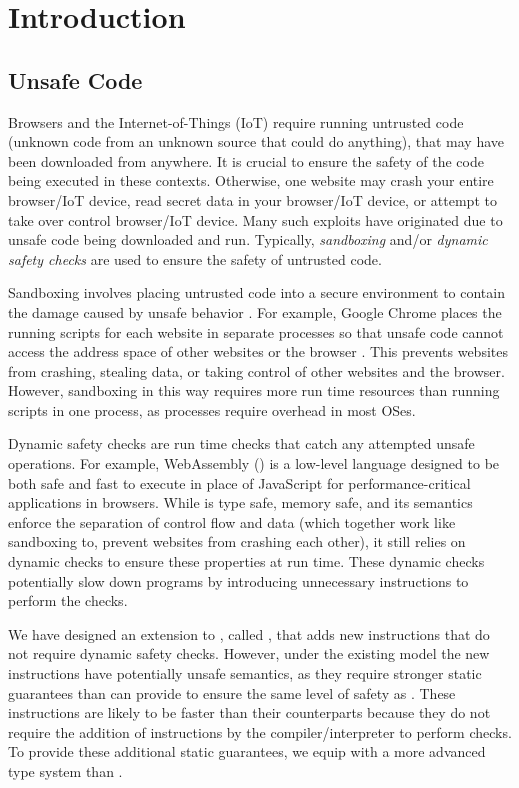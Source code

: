 \chapter{Introduction}
\label{chp:intro}

\section{Unsafe Code}
Browsers and the Internet-of-Things (IoT) require running untrusted code (\ie unknown code from an unknown source that could do anything), that may have been downloaded from anywhere.
It is crucial to ensure the safety of the code being executed in these contexts.
Otherwise, one website may crash your entire browser/IoT device, read secret data in your browser/IoT device, or attempt to take over control browser/IoT device.
Many such exploits have originated due to unsafe code being downloaded and run.
Typically, \emph{sandboxing} and/or \emph{dynamic safety checks} are used to ensure the safety of untrusted code.

Sandboxing involves placing untrusted code into a secure environment to contain the damage caused by unsafe behavior \cite{sandboxes}.
For example, Google Chrome places the running scripts for each website in separate processes so that unsafe code cannot access the address space of other websites or the browser \cite{chromesandbox}.
This prevents websites from crashing, stealing data, or taking control of other websites and the browser.
However, sandboxing in this way requires more run time resources than running scripts in one process, as processes require overhead in most OSes.

Dynamic safety checks are run time checks that catch any attempted unsafe operations.
For example, WebAssembly (\wasm) is a low-level language designed to be both safe and fast to execute in place of JavaScript for performance-critical applications in browsers.
While \wasm is type safe, memory safe, and its semantics enforce the separation of control flow and data (which together work like sandboxing to, \eg prevent websites from crashing each other), it still relies on dynamic checks to ensure these properties at run time.
These dynamic checks potentially slow down programs by introducing unnecessary instructions to perform the checks.

We have designed an extension to \wasm, called \name, that adds new instructions that do not require dynamic safety checks.
However, under the existing \wasm model the new \name instructions have potentially unsafe semantics, as they require stronger static guarantees than \wasm can provide to ensure the same level of safety as \wasm.
These instructions are likely to be faster than their \wasm counterparts because they do not require the addition of instructions by the compiler/interpreter to perform checks.
To provide these additional static guarantees, we equip \name with a more advanced type system than \wasm.

